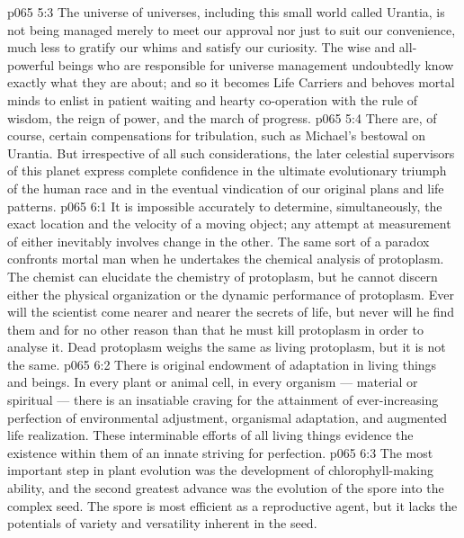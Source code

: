 \vs p065 5:3 The universe of universes, including this small world called Urantia, is not being managed merely to meet our approval nor just to suit our convenience, much less to gratify our whims and satisfy our curiosity. The wise and all\hyp{}powerful beings who are responsible for universe management undoubtedly know exactly what they are about; and so it becomes Life Carriers and behoves mortal minds to enlist in patient waiting and hearty co\hyp{}operation with the rule of wisdom, the reign of power, and the march of progress.
\vs p065 5:4 There are, of course, certain compensations for tribulation, such as Michael’s bestowal on Urantia. But irrespective of all such considerations, the later celestial supervisors of this planet express complete confidence in the ultimate evolutionary triumph of the human race and in the eventual vindication of our original plans and life patterns.
\vs p065 6:1 It is impossible accurately to determine, simultaneously, the exact location and the velocity of a moving object; any attempt at measurement of either inevitably involves change in the other. The same sort of a paradox confronts mortal man when he undertakes the chemical analysis of protoplasm. The chemist can elucidate the chemistry of  protoplasm, but he cannot discern either the physical organization or the dynamic performance of  protoplasm. Ever will the scientist come nearer and nearer the secrets of life, but never will he find them and for no other reason than that he must kill protoplasm in order to analyse it. Dead protoplasm weighs the same as living protoplasm, but it is not the same.
\vs p065 6:2 \pc There is original endowment of adaptation in living things and beings. In every  plant or animal cell, in every  organism --- material or spiritual --- there is an insatiable craving for the attainment of ever\hyp{}increasing perfection of environmental adjustment, organismal adaptation, and augmented life realization. These interminable efforts of all living things evidence the existence within them of an innate striving for perfection.
\vs p065 6:3 The most important step in plant evolution was the development of chlorophyll\hyp{}making ability, and the second greatest advance was the evolution of the spore into the complex seed. The spore is most efficient as a reproductive agent, but it lacks the potentials of variety and versatility inherent in the seed.
